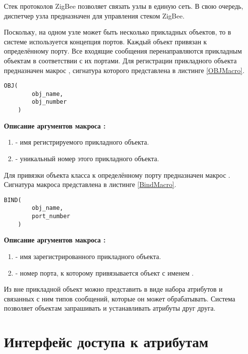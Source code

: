 Стек протоколов ZigBee позволяет связать узлы в единую сеть. В свою очередь, диспетчер узла предназначен
для управления стеком ZigBee. 

Поскольку, на одном узле может быть несколько прикладных объектов, то в системе \zigzag используется
концепция портов. Каждый объект привязан к определённому порту. Все входящие сообщения перенаправляются
прикладным объектам в соответствии с их портами. Для регистрации прикладного объекта предназначен макрос
, сигнатура которого представлена в листинге \ref{OBJMacro}.

\begin{lstlisting}[caption=Сигнатура макроса OBJ, label=OBJMacro]
    OBJ( 
        obj_name,
        obj_number
    )
\end{lstlisting}

{\bfseries Описание аргументов макроса :}

{\itshape
\begin{enumerate}
\item {} - имя регистрируемого прикладного объекта. 
\item {} - уникальный номер этого прикладного объекта.
\end{enumerate}
}

Для привязки объекта класса к определённому порту предназначен макрос . Сигнатура 
макроса представлена в листинге \ref{BindMacro}.

\begin{lstlisting}[caption=Сигнатура макроса BIND, label=BindMacro]
    BIND( 
        obj_name,
        port_number
    )
\end{lstlisting}

{\bfseries Описание аргументов макроса :}

{\itshape
\begin{enumerate}
\item {} - имя зарегистрированного прикладного объекта. 
\item {} - номер порта, к которому привязывается объект с именем .
\end{enumerate}
}

Из вне прикладной объект можно представить в виде набора атрибутов и связанных с ним типов сообщений, которые
он может обрабатывать. Система \zigzag позволяет объектам запрашивать и устанавливать атрибуты друг друга.

\section{Интерфейс доступа к атрибутам}

